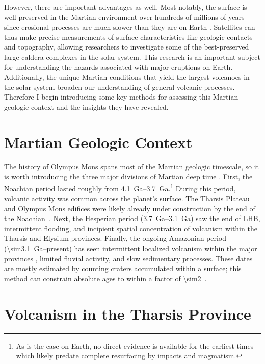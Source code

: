 However, there are important advantages as well. Most notably, the surface is well preserved in the Martian environment over hundreds of millions of years since erosional processes are much slower than they are on Earth \parencite{gunn_accumulation_2022}. Satellites can thus make precise measurements of surface characteristics like geologic contacts and topography, allowing researchers to investigate some of the best-preserved large caldera complexes in the solar system. This research is an important subject for understanding the hazards associated with major eruptions on Earth. Additionally, the unique Martian conditions that yield the largest volcanoes in the solar system broaden our understanding of general volcanic processes. Therefore I begin introducing some key methods for assessing this Martian geologic context and the insights they have revealed.

\section{Martian Geologic Context}

The history of Olympus Mons spans most of the Martian geologic timescale, so it is worth introducing the three major divisions of Martian deep time \parencite{carr_geologic_2010}. First, the Noachian period lasted roughly from \qtyrange{4.1}{3.7}{Ga}.\footnote{As is the case on Earth, no direct evidence is available for the earliest times which likely predate complete resurfacing by impacts and magmatism.} During this period, volcanic activity was common across the planet's surface. The Tharsis Plateau and Olympus Mons edifices were likely already under construction by the end of the Noachian~\parencite[cf.][]{isherwood_volcanic_2013,broquet_gravitational_2019}. Next, the Hesperian period (\qtyrange{3.7}{3.1}{Ga}) saw the end of \acl{LHB}, intermittent flooding, and incipient spatial concentration of volcanism within the Tharsis and Elysium provinces. Finally, the ongoing Amazonian period (\qty{\sim3.1}{Ga}--present) has seen intermittent localized volcanism within the major provinces \parencite[e.g.,][]{grott_long-term_2013}, limited fluvial activity, and slow sedimentary processes. These dates are mostly estimated by counting craters accumulated within a surface; this method can constrain absolute ages to within a factor of \num{\sim2}~\parencite[e.g.,][]{kneissl_map-projection-independent_2011}.

\section{Volcanism in the Tharsis Province}

